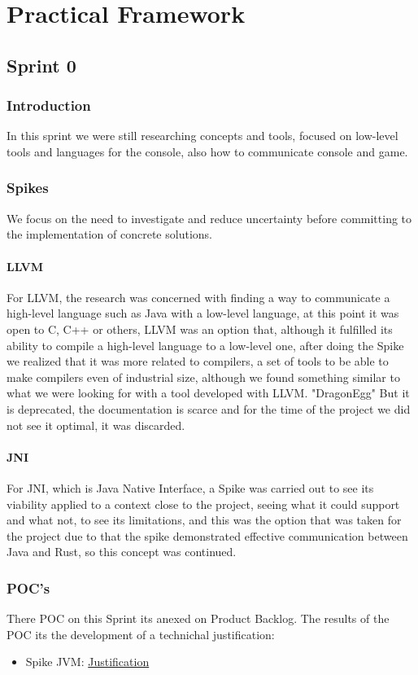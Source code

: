 \section{Practical Framework}

\subsection{Sprint 0}
\subsubsection{Introduction}
In this sprint we were still researching concepts and tools, focused on low-level tools and languages for the console, also how to communicate console and game.
\subsubsection{Spikes}
We focus on the need to investigate and reduce uncertainty before committing to the implementation of concrete solutions.
\paragraph{LLVM}
For LLVM, the research was concerned with finding a way to communicate a high-level language such as Java with a low-level language, at this point it was open to C, C++ or others, LLVM was an option that, although it fulfilled its ability to compile a high-level language to a low-level one, after doing the Spike we realized that it was more related to compilers, a set of tools to be able to make compilers even of industrial size, although we found something similar to what we were looking for with a tool developed with LLVM. "DragonEgg" But it is deprecated, the documentation is scarce and for the time of the project we did not see it optimal, it was discarded.
\paragraph{JNI}
For JNI, which is Java Native Interface, a Spike was carried out to see its viability applied to a context close to the project, seeing what it could support and what not, to see its limitations, and this was the option that was taken for the project due to that the spike demonstrated effective communication between Java and Rust, so this concept was continued.
\subsubsection{POC's}
There POC on this Sprint its anexed on Product Backlog.
The results of the POC its the development of a technichal justification:
\begin{itemize}    
    \item Spike JVM: \href{https://docs.google.com/document/d/1OWdCxe9lFPcMpADiyAyRCWGAioo0fwIuzMuRER24MHM/edit#heading=h.ql4vc1ru9w5i}{Justification}
\end{itemize}


